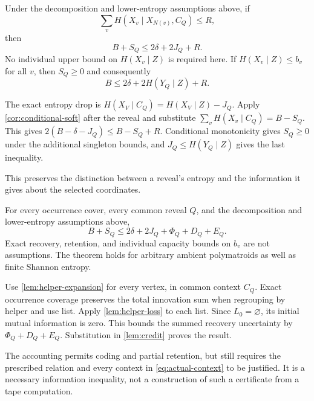 \begin{lemma}\label{lem:credit}
Under the decomposition and lower-entropy assumptions above, if
\[
\sum_v H(X_v\mid X_{N(v)},C_Q)\le R,
\]
then
\begin{equation}
B+S_Q\le 2\delta+2J_Q+R.
\label{eq:credit-bound}
\end{equation}
No individual upper bound on $H(X_v\mid Z)$ is required here. If
$H(X_v\mid Z)\le b_v$ for all $v$, then $S_Q\ge0$ and consequently
\[
B\le 2\delta+2H(Y_Q\mid Z)+R.
\]
\end{lemma}
\begin{outline}
The exact entropy drop is
$H(X_V\mid C_Q)=H(X_V\mid Z)-J_Q$.
Apply \cref{cor:conditional-soft} after the reveal and substitute
$\sum_v H(X_v\mid C_Q)=B-S_Q$. This gives
$2(B-\delta-J_Q)\le B-S_Q+R$.
Conditional monotonicity gives $S_Q\ge0$ under the additional singleton
bounds, and $J_Q\le H(Y_Q\mid Z)$ gives the last inequality.
\end{outline}
This preserves the distinction between a reveal's entropy and the
information it gives about the selected coordinates.

\begin{theorem}\label{thm:information}
For every occurrence cover, every common reveal $Q$, and the
decomposition and lower-entropy assumptions above,
\begin{equation}
\boxed{\ B+S_Q\le 2\delta+2J_Q+\Phi_Q+D_Q+E_Q.\ }
\label{eq:information-bound}
\end{equation}
Exact recovery, retention, and individual capacity bounds on $b_v$
are not assumptions. The theorem holds for arbitrary ambient
polymatroids as well as finite Shannon entropy.
\end{theorem}
\begin{outline}
Use \cref{lem:helper-expansion} for every vertex, in common context
$C_Q$. Exact occurrence coverage preserves the total innovation sum
when regrouping by helper and use list. Apply
\cref{lem:helper-loss} to each list. Since $L_0=\varnothing$, its
initial mutual information is zero. This bounds the summed recovery
uncertainty by $\Phi_Q+D_Q+E_Q$. Substitution in
\cref{lem:credit} proves the result.
\end{outline}
The accounting permits coding and partial retention, but still requires
the prescribed relation and every context in \eqref{eq:actual-context}
to be justified. It is a necessary information inequality, not a
construction of such a certificate from a tape computation.

